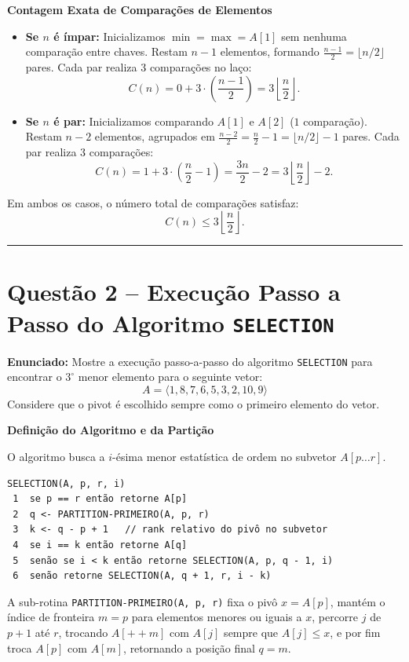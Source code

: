 \documentclass[11pt,a4paper]{article}
\newcommand{\res}[1]{\[\boxed{#1}\]}
\newcommand{\topico}[1]{\par\medskip\textbf{\color{azul}#1}\par}
\newcommand{\questao}[2]{\section*{Questão #1 -- #2}}
\begin{document}
\topico{Contagem Exata de Comparações de Elementos}
\begin{itemize}
    \item \textbf{Se $n$ é ímpar:} Inicializamos $\min = \max = A[1]$ sem nenhuma comparação entre chaves. Restam $n-1$ elementos, formando $\frac{n-1}{2} = \lfloor n/2 \rfloor$ pares. Cada par realiza $3$ comparações no laço:
    \[
    C(n) = 0 + 3 \cdot \left(\frac{n-1}{2}\right) = 3\left\lfloor \frac{n}{2} \right\rfloor.
    \]
    \item \textbf{Se $n$ é par:} Inicializamos comparando $A[1]$ e $A[2]$ ($1$ comparação). Restam $n-2$ elementos, agrupados em $\frac{n-2}{2} = \frac{n}{2} - 1 = \lfloor n/2 \rfloor - 1$ pares. Cada par realiza $3$ comparações:
    \[
    C(n) = 1 + 3 \cdot \left(\frac{n}{2} - 1\right) = \frac{3n}{2} - 2 = 3\left\lfloor \frac{n}{2} \right\rfloor - 2.
    \]
\end{itemize}
Em ambos os casos, o número total de comparações satisfaz:
\res{C(n) \le 3\left\lfloor \frac{n}{2} \right\rfloor.}

\vspace{12pt}
\hrule
\vspace{6pt}
\questao{2}{Execução Passo a Passo do Algoritmo \texttt{SELECTION}}

\textbf{Enunciado:} Mostre a execução passo-a-passo do algoritmo \texttt{SELECTION} para encontrar o $3^\circ$ menor elemento para o seguinte vetor:
\[
A = \langle 1, 8, 7, 6, 5, 3, 2, 10, 9 \rangle
\]
Considere que o pivot é escolhido sempre como o primeiro elemento do vetor.

\topico{Definição do Algoritmo e da Partição}
O algoritmo busca a $i$-ésima menor estatística de ordem no subvetor $A[p \dots r]$.
\begin{lstlisting}
SELECTION(A, p, r, i)
 1  se p == r então retorne A[p]
 2  q <- PARTITION-PRIMEIRO(A, p, r)
 3  k <- q - p + 1   // rank relativo do pivô no subvetor
 4  se i == k então retorne A[q]
 5  senão se i < k então retorne SELECTION(A, p, q - 1, i)
 6  senão retorne SELECTION(A, q + 1, r, i - k)
\end{lstlisting}
A sub-rotina \texttt{PARTITION-PRIMEIRO(A, p, r)} fixa o pivô $x = A[p]$, mantém o índice de fronteira $m = p$ para elementos menores ou iguais a $x$, percorre $j$ de $p+1$ até $r$, trocando $A[++m]$ com $A[j]$ sempre que $A[j] \le x$, e por fim troca $A[p]$ com $A[m]$, retornando a posição final $q = m$.
\end{document}
